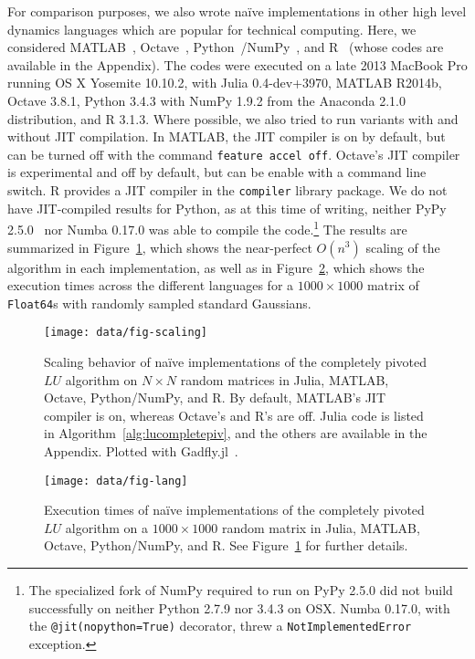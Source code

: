 For comparison purposes, we also wrote na\"ive implementations in other high
level dynamics languages which are popular for technical computing. Here, we
considered MATLAB~\cite{matlab}, Octave~\cite{octave},
Python~\cite{python}/NumPy~\cite{numpy}, and R~\cite{rlang} (whose codes are
available in the Appendix). The codes were executed on a late 2013 MacBook Pro
running OS X
Yosemite 10.10.2, with Julia 0.4-dev+3970, MATLAB R2014b, Octave 3.8.1, Python
3.4.3 with NumPy 1.9.2 from the Anaconda 2.1.0 distribution, and R 3.1.3. Where
possible, we also tried to run variants with and without JIT compilation. In
MATLAB, the JIT compiler is on by default, but can be turned off with the
command \lstinline|feature accel off|. Octave's JIT compiler is experimental
and off by default, but can be enable with a command line switch. R provides a
JIT compiler in the \lstinline|compiler| library package. We do not have
JIT-compiled results for Python, as at this time of writing, neither PyPy
2.5.0~\cite{Bolz2009} nor Numba 0.17.0 was able to compile the code.\footnote{
The specialized fork of NumPy required to run on PyPy 2.5.0 did not build
successfully on neither Python 2.7.9 nor 3.4.3 on OSX. Numba 0.17.0, with the
\lstinline|@jit(nopython=True)| decorator, threw a
\lstinline|NotImplementedError| exception.}
The results are summarized in Figure~\ref{fig:scaling}, which shows the
near-perfect $O(n^3)$ scaling of the algorithm in each implementation, as well
as in Figure~\ref{fig:naivelangs}, which shows the execution times across the
different languages for a $1000 \times 1000$ matrix of \lstinline|Float64|s
with randomly sampled standard Gaussians.



\begin{figure}
	\texttt{[image: data/fig-scaling]}
	\caption{Scaling behavior of na\"ive implementations of the completely
	pivoted $LU$ algorithm on $N\times N$ random matrices in Julia, MATLAB,
	Octave, Python/NumPy, and R. By default, MATLAB's JIT compiler is on,
	whereas Octave's and R's are off. Julia code is listed in
	Algorithm~\ref{alg:lucompletepiv}, and the others are available in the
	Appendix. Plotted with Gadfly.jl~\cite{gadfly_jl}.}
	\label{fig:scaling}
\end{figure}

\begin{figure}
	\texttt{[image: data/fig-lang]}
	\caption{Execution times of na\"ive implementations of the
	completely pivoted $LU$ algorithm on a $1000\times1000$ random matrix
	in Julia, MATLAB, Octave, Python/NumPy, and R. See Figure~\ref{fig:scaling}
	for further details.}
	\label{fig:naivelangs}
\end{figure}



